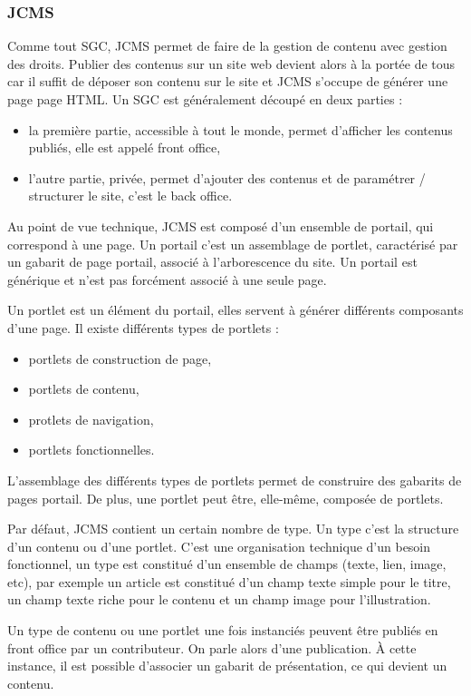 \documentclass[12pt,a4paper]{article}
\begin{document}
\subsubsection{JCMS}
Comme tout SGC, \gls{JCMS} permet de faire de la gestion de contenu avec gestion des droits. Publier des contenus sur un site web devient alors à la portée de tous car il suffit de déposer son contenu sur le site et \gls{JCMS} s'occupe de générer une page page HTML. Un SGC est généralement découpé en deux parties : 
\begin{itemize}
\item la première partie, accessible à tout le monde, permet d'afficher les contenus publiés, elle est appelé front office,
\item l'autre partie, privée, permet d'ajouter des contenus et de paramétrer / structurer le site, c'est le back office.
\end{itemize}\par
Au point de vue technique, \gls{JCMS} est composé d'un ensemble de portail, qui correspond à une page. Un portail c'est un assemblage de portlet, caractérisé par un gabarit de page portail, associé à l'arborescence du site. Un portail est générique et n'est pas forcément associé à une seule page.\par 
Un portlet est un élément du portail, elles servent à générer différents composants d'une page. Il existe différents types de portlets : 
\begin{itemize}
\item portlets de construction de page,
\item portlets de contenu,
\item protlets de navigation,
\item portlets fonctionnelles.
\end{itemize}
L'assemblage des différents types de portlets permet de construire des gabarits de pages portail. De plus, une portlet peut être, elle-même, composée de portlets.\par 
Par défaut, \gls{JCMS} contient un certain nombre de type. Un type c'est la structure d'un contenu ou d'une portlet. C'est une organisation technique d'un besoin fonctionnel, un type est constitué d'un ensemble de champs (texte, lien, image, etc), par exemple un article est constitué d'un champ texte simple pour le titre, un champ texte riche pour le contenu et un champ image pour l'illustration.\par 
Un type de contenu ou une portlet une fois instanciés peuvent être publiés en front office par un contributeur. On parle alors d'une publication. À cette instance, il est possible d'associer un gabarit de présentation, ce qui devient un contenu.\par
\end{document}
